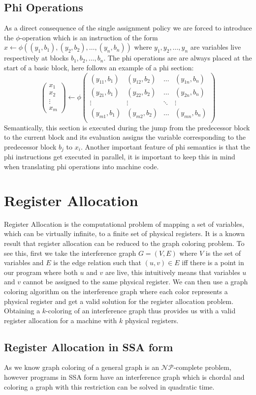 \subsection{Phi Operations}
As a direct consequence of the single assignment policy we are forced to introduce the $\phi$-operation which is an instruction of the form $x \leftarrow \phi((y_1, b_1), (y_2, b_2), \dots, (y_n, b_n))$ where $y_1, y_2, \dots, y_n$ are variables live respectively at blocks $b_1, b_2, \dots, b_n$.
The phi operations are are always placed at the start of a basic block, here follows an example of a phi section:
\[
\begin{pmatrix}
    x_1 \\ x_2 \\ \vdots \\ x_m
\end{pmatrix}
\leftarrow \phi
\begin{pmatrix}
    (y_{11}, b_1) & (y_{12}, b_2) & \dots & (y_{1n}, b_n) \\
    (y_{21}, b_1) & (y_{22}, b_2) & \dots & (y_{2n}, b_n) \\
    \vdots & \vdots & \ddots & \vdots \\
    (y_{m1}, b_1) & (y_{m2}, b_2) & \dots & (y_{mn}, b_n) \\
\end{pmatrix}
\]
Semantically, this section is executed during the jump from the predecessor block to the current block and its evaluation assigns the variable corresponding to the predecessor block $b_j$ to $x_i$.
Another important feature of phi semantics is that the phi instructions get executed in parallel, it is important to keep this in mind when translating phi operations into machine code.

\section{Register Allocation}
\label{sec:ra}

Register Allocation is the computational problem of mapping a set of variables, which can be virtually infinite, to a finite set of physical registers. It is a known result that register allocation can be reduced to the graph coloring problem. To see this, first we take the interference graph $G = (V, E)$ where $V$ is the set of variables and $E$ is the edge relation such that $(u, v) \in E$ iff there is a point in our program where both $u$ and $v$ are live, this intuitively means that variables $u$ and $v$ cannot be assigned to the same physical register.
We can then use a graph coloring algorithm on the interference graph where each color represents a physical register and get a valid solution for the register allocation problem.
Obtaining a $k$-coloring of an interference graph thus provides us with a valid register allocation for a machine with $k$ physical registers.

\subsection{Register Allocation in SSA form}
As we know graph coloring of a general graph is an $\mathcal{NP}$-complete problem, however programs in SSA form have an interference graph which is chordal and coloring a graph with this restriction can be solved in quadratic time.

